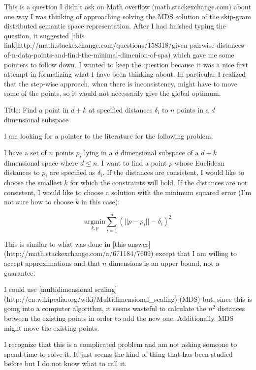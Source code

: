 This is a question I didn't ask on Math overflow (math.stackexchange.com) about one way I was thinking of approaching solving the MDS solution of the skip-gram distributed semantic space representation. After I had finished typing the question, it suggested [this link]http://math.stackexchange.com/questions/158318/given-pairwise-distances-of-n-data-points-and-find-the-minimal-dimenion-of-spa) which gave me some pointers to follow down. I wanted to keep the question because it was a nice first attempt in formalizing what I have been thinking about. In particular I realized that the step-wise approach, when there is inconsistency, might have to move some of the points, so it would not necessarily give the global optimum.

Title: Find a point in $d+k$ at specified distances $\delta_i$ to $n$ points in a $d$ dimensional subspace

I am looking for a pointer to the literature for the following problem:

I have a set of $n$ points $p_i$ lying in a $d$ dimensional subspace of a $d+k$ dimensional space where $d \le n$. I want to find a point $p$ whose Euclidean distances to $p_i$ are specified as $\delta_i$. If the distances are consistent, I would like to choose the smallest $k$ for which the constraints will hold. If the distances are not consistent, I would like to choose a solution with the minimum squared error (I'm not sure how to choose $k$ in this case):

$$\underset{k,p} {\mathrm{argmin}}  \sum_{i=1}^n (||p-p_i||-\delta_i)^2$$

This is similar to what was done in [this answer](http://math.stackexchange.com/a/671184/7609) except that I am willing to accept approximations and that $n$ dimensions is an upper bound, not a guarantee.

I could use [multidimensional scaling](http://en.wikipedia.org/wiki/Multidimensional_scaling) (MDS) but, since this is going into a computer algorithm, it seems wasteful to calculate the $n^2$ distances between the existing points in order to add the new one. Additionally, MDS might move the existing points.

I recognize that this is a complicated problem and am not asking someone to spend time to solve it. It just seems the kind of thing that has been studied before but I do not know what to call it.
